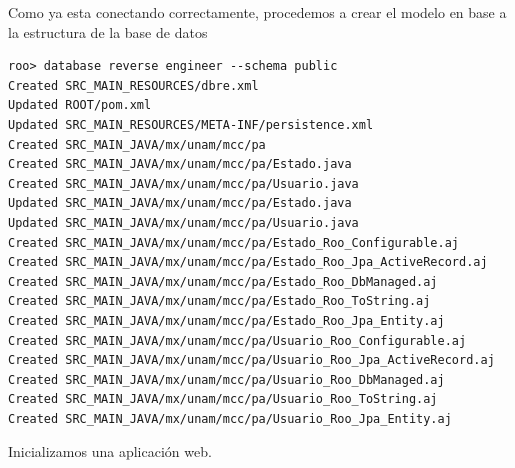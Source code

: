 \documentclass[12pt]{article}
\begin{document}
\begin{enumerate}
Como ya esta conectando correctamente, procedemos a crear el modelo en base a la estructura de la base de datos

\begin{lstlisting}[frame=single] 
roo> database reverse engineer --schema public
Created SRC_MAIN_RESOURCES/dbre.xml
Updated ROOT/pom.xml
Updated SRC_MAIN_RESOURCES/META-INF/persistence.xml
Created SRC_MAIN_JAVA/mx/unam/mcc/pa
Created SRC_MAIN_JAVA/mx/unam/mcc/pa/Estado.java
Created SRC_MAIN_JAVA/mx/unam/mcc/pa/Usuario.java
Updated SRC_MAIN_JAVA/mx/unam/mcc/pa/Estado.java
Updated SRC_MAIN_JAVA/mx/unam/mcc/pa/Usuario.java
Created SRC_MAIN_JAVA/mx/unam/mcc/pa/Estado_Roo_Configurable.aj
Created SRC_MAIN_JAVA/mx/unam/mcc/pa/Estado_Roo_Jpa_ActiveRecord.aj
Created SRC_MAIN_JAVA/mx/unam/mcc/pa/Estado_Roo_DbManaged.aj
Created SRC_MAIN_JAVA/mx/unam/mcc/pa/Estado_Roo_ToString.aj
Created SRC_MAIN_JAVA/mx/unam/mcc/pa/Estado_Roo_Jpa_Entity.aj
Created SRC_MAIN_JAVA/mx/unam/mcc/pa/Usuario_Roo_Configurable.aj
Created SRC_MAIN_JAVA/mx/unam/mcc/pa/Usuario_Roo_Jpa_ActiveRecord.aj
Created SRC_MAIN_JAVA/mx/unam/mcc/pa/Usuario_Roo_DbManaged.aj
Created SRC_MAIN_JAVA/mx/unam/mcc/pa/Usuario_Roo_ToString.aj
Created SRC_MAIN_JAVA/mx/unam/mcc/pa/Usuario_Roo_Jpa_Entity.aj
\end{lstlisting}

Inicializamos una  aplicación web.


\end{enumerate}
\end{document}
